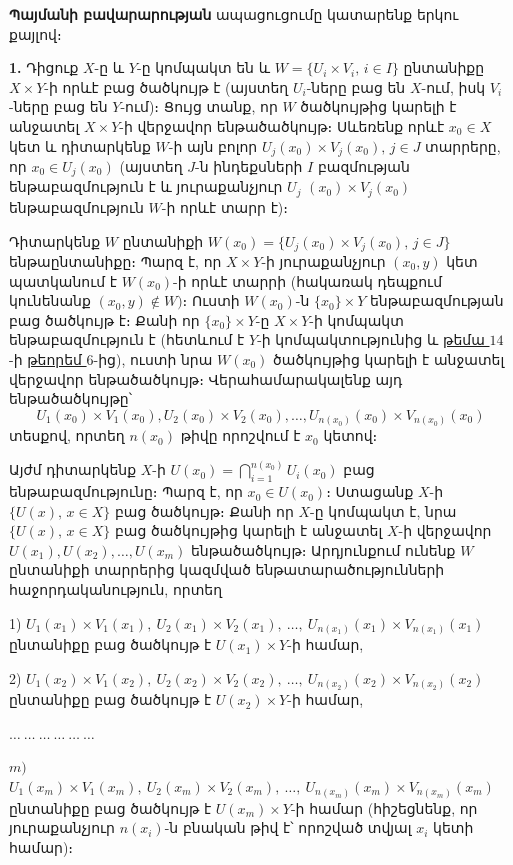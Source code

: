 \documentclass[./main.tex]{subfiles}
\begin{document}
\begin{varproof}
\textbf{Պայմանի բավարարության} ապացուցումը կատարենք երկու քայլով։

\par \textbf{1.} Դիցուք $X$-ը և $Y$-ը կոմպակտ են և $W=\{ U_i\times V_i,\, i\in I\}$ ընտանիքը $X\times Y$-ի որևէ բաց ծածկույթ է (այստեղ $U_i$-ները բաց են $X$-ում, իսկ $V_i$-ները բաց են $Y$-ում)։ Ցույց տանք, որ $W$ ծածկույթից կարելի է անջատել $X\times Y$-ի վերջավոր ենթածածկույթ։ Սևեռենք որևէ $x_0\in X$ կետ և դիտարկենք $W$-ի այն բոլոր $U_j (x_0) \times V_j (x_0 ),\, j\in J$ տարրերը, որ $x_0\in U_j (x_0)$ (այստեղ $J$-ն ինդեքսների $I$ բազմության ենթաբազմություն է և յուրաքանչյուր $U_j$ $(x_0)\times V_j(x_0)$ ենթաբազմություն $W$-ի որևէ տարր է)։ 
\par Դիտարկենք $W$ ընտանիքի $W(x_0)=\{ U_j (x_0 )\times V_j (x_0 ),\, j\in J\}$ ենթաընտանիքը։ Պարզ է, որ $X\times Y$-ի յուրաքանչյուր $(x_0,y)$ կետ պատկանում է $W(x_0)$-ի որևէ տարրի (հակառակ դեպքում կունենանք $(x_0,y)\notin W)$։ Ուստի $W(x_0)$-ն $\{ x_0\} \times Y$ ենթաբազ\-մութ\-յան բաց ծածկույթ է։ Քանի որ $\{x_0\}\times Y$-ը $X\times Y$-ի կոմպակտ ենթաբազմություն է (հետևում է $Y$-ի կոմպակտությունից և \hyperlink{sec:14}{թեմա $14$}-ի \hyperref[ch14thm6]{թեորեմ $6$}-ից), ուստի նրա $W(x_0)$ ծածկույթից կարելի է անջատել վերջավոր են\-թա\-ծած\-կույթ։ Վերահամարակալենք այդ ենթածածկույթը՝
\[ U_1 (x_0)\times V_1 (x_0), U_2 (x_0)\times V_2 (x_0),\dots,U_{n(x_0)} (x_0)\times V_{n(x_0)}(x_0)\]
տեսքով, որտեղ $n(x_0)$ թիվը որոշվում է $x_0$ կետով։
\par Այժմ դիտարկենք $X$-ի $U(x_0)=\bigcap\limits_{i=1}^{n(x_0)}U_i(x_0)$ բաց ենթաբազմությունը։ Պարզ է, որ $x_0\in U(x_0 )$։ Ստացանք $X$-ի $\{ U(x),\, x\in X\}$ բաց ծածկույթ։ Քանի որ $X$-ը կոմպակտ է, նրա $\{U(x),\, x\in X\}$ բաց ծածկույթից կարելի է անջատել $X$-ի վերջավոր $U(x_1),U(x_2),\dots,U(x_m)$ ենթածածկույթ։ Արդյունքում ունենք $W$ ընտանիքի տար\-րե\-րից կազմված ենթատարածությունների հաջորդականություն, որտեղ
\par
1) $U_1 (x_1)\times V_1(x_1),\ U_2 (x_1)\times V_2(x_1 ),\ \dots,\ U_{n(x_1)}(x_1)\times V_{n(x_1)} (x_1)$ ընտանիքը բաց ծածկույթ է $U(x_1)\times Y$-ի համար,\par 2)
$U_1(x_2)\times V_1 (x_2),\ U_2(x_2 )\times V_2(x_2 ),\ \dots,\ U_{n(x_2)} (x_2)\times V_{n(x_2)} (x_2)$ ընտանիքը բաց ծածկույթ է $U(x_2)\times Y$-ի համար,\par
$\dots\ \dots\ \dots\ \dots\ \dots\ \dots\ $ \par $m)$
$U_1 (x_m)\times V_1(x_m),\ U_2 (x_m )\times V_2(x_m),\ \dots,\ U_{n(x_m)} (x_m)\times V_{n(x_m)}(x_m)$ ընտանիքը բաց ծածկույթ է $U(x_m)\times Y$-ի համար (հիշեցնենք, որ յուրաքանչյուր $n(x_i)$-ն բնա\-կան թիվ է՝ որոշված տվյալ $x_i$ կետի համար)։


\end{varproof}
\end{document}
